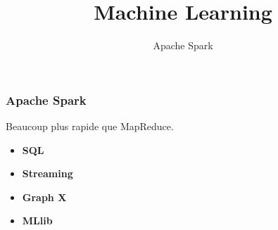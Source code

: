 \documentclass{formation}
\title{Machine Learning}
\subtitle{Apache Spark}
\begin{document}
\begin{frame}
  \frametitle{Apache Spark}
  Beaucoup plus rapide que MapReduce.
  \begin{itemize}
  \item \textbf{SQL}
  \item \textbf{Streaming}
  \item \textbf{Graph X}
  \item \textbf{MLlib}
  \end{itemize}
\end{frame}
\end{document}
